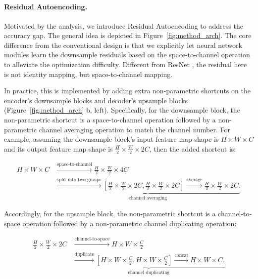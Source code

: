 

\subsection{\modelfull}\label{sec:main_model}
\paragraph{Residual Autoencoding.} Motivated by the analysis, we introduce Residual Autoencoding to address the accuracy gap. The general idea is depicted in Figure~\ref{fig:method_arch}. The core difference from the conventional design is that we explicitly let neural network modules learn the downsample residuals based on the space-to-channel operation to alleviate the optimization difficulty. Different from ResNet \citep{he2016deep}, the residual here is not identity mapping, but space-to-channel mapping.

In practice, this is implemented by adding extra non-parametric shortcuts on the encoder's downsample blocks and decoder's upsample blocks (Figure~\ref{fig:method_arch} b, left). Specifically, for the downsample block, the non-parametric shortcut is a space-to-channel operation followed by a non-parametric channel averaging operation to match the channel number. For example, assuming the downsample block's input feature map shape is $H \times W \times C$ and its output feature map shape is $\frac{H}{2} \times \frac{W}{2} \times 2C$, then the added shortcut is:

{\small
\begin{align}
    H \times W \times C & \xrightarrow{\text{space-to-channel}} \frac{H}{2} \times \frac{W}{2} \times 4C \nonumber \\
    & \underbrace{\xrightarrow{\text{split into two groups}} [\frac{H}{2} \times \frac{W}{2} \times 2C, \frac{H}{2} \times \frac{W}{2} \times 2C] \xrightarrow{\text{average}} \frac{H}{2} \times \frac{W}{2} \times 2C.}_{\text{channel averaging}} \nonumber
\end{align}
}

Accordingly, for the upsample block, the non-parametric shortcut is a channel-to-space operation followed by a non-parametric channel duplicating operation:

{\small
\begin{align}
    \frac{H}{2} \times \frac{W}{2} \times 2C & \xrightarrow{\text{channel-to-space}}  \nonumber H \times W \times \frac{C}{2} \\
    & \underbrace{\xrightarrow{\text{duplicate}} [H \times W \times \frac{C}{2}, H \times W \times \frac{C}{2}] \xrightarrow{\text{concat}} H \times W \times C.}_{\text{channel duplicating}} \nonumber
\end{align}
}


